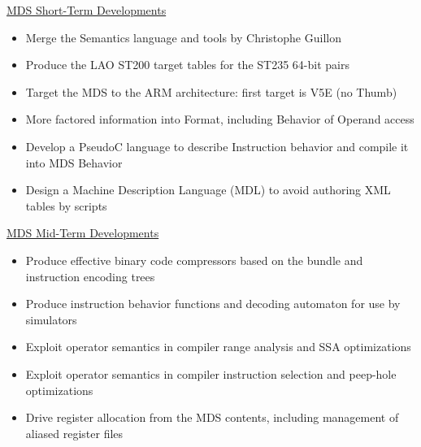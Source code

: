 \documentclass[a4]{seminar}
\begin{document}
\begin{slide}


\begin{center} \underline{MDS Short-Term Developments} \end{center}

\begin{itemize}

\item Merge the Semantics language and tools by Christophe Guillon

\item Produce the LAO ST200 target tables for the ST235 64-bit pairs

\item Target the MDS to the ARM architecture: first target is V5E (no Thumb)

\item More factored information into Format, including Behavior of Operand access

\item Develop a PseudoC language to describe Instruction behavior and compile
it into MDS Behavior

\item Design a Machine Description Language (MDL) to avoid authoring XML tables
by scripts

\end{itemize}

\end{slide}


\begin{slide}

\begin{center} \underline{MDS Mid-Term Developments} \end{center}

\begin{itemize}

\item Produce effective binary code compressors based on the bundle and
instruction encoding trees

\item Produce instruction behavior functions and decoding automaton for use by
simulators

\item Exploit operator semantics in compiler range analysis and SSA
optimizations

\item Exploit operator semantics in compiler instruction selection and peep-hole
optimizations

\item Drive register allocation from the MDS contents, including management of
aliased register files

\end{itemize}

\end{slide}
\end{document}
